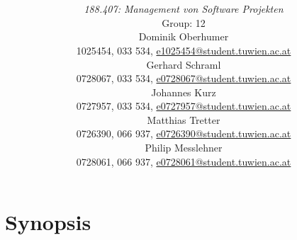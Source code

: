 \documentclass[a4paper,11pt]{article}
\title{\textbf{\sffamily\Huge \ShortTitle}\\ 
{\textbf{\sffamily\Large \FullTitle}}
\vspace{1cm}}
\author{
{\em 188.407: Management von Software Projekten} \vspace{1cm} \\
Group: 12\bigskip \\
Dominik Oberhumer \\ {\small 1025454, 033 534, \href{mailto:e1025454@student.tuwien.ac.at}{e1025454@student.tuwien.ac.at}}\\
Gerhard Schraml \\ {\small 0728067, 033 534, \href{mailto:e0728067@student.tuwien.ac.at}{e0728067@student.tuwien.ac.at}}\\
Johannes Kurz \\ {\small 0727957, 033 534, \href{mailto:e0727957@student.tuwien.ac.at}{e0727957@student.tuwien.ac.at}}\\
Matthias Tretter \\ {\small 0726390, 066 937,  \href{mailto:e0726390@student.tuwien.ac.at}{e0726390@student.tuwien.ac.at}}\\
Philip Messlehner \\ {\small 0728061, 066 937, \href{mailto:e0728061@student.tuwien.ac.at}{e0728061@student.tuwien.ac.at}}\\
\vspace{4cm}
}
\providecommand*{\note}[1]{\small \textcolor{RoyalBlue}{\begin{minipage}{\textwidth}{#1}\end{minipage}}}
\begin{document}
\begin{titlepage}
\maketitle

\end{titlepage}


\thispagestyle{empty}
\tableofcontents
\pagebreak

\setcounter{page}{1}




\section{Synopsis}
\label{sect:synopsis}
\end{document}
